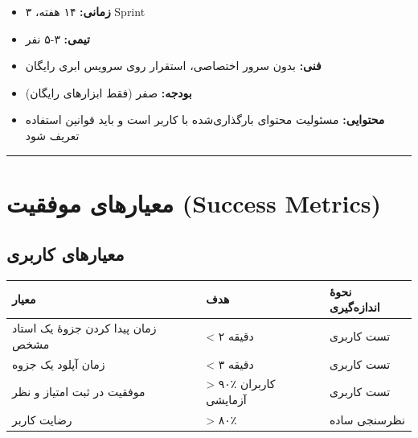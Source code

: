 \documentclass[12pt, a4paper]{article}
\begin{document}
\begin{itemize}
\tightlist
\item
  \textbf{زمانی:} ۱۴ هفته، ۳ Sprint
\item
  \textbf{تیمی:} ۳-۵ نفر
\item
  \textbf{فنی:} بدون سرور اختصاصی، استقرار روی سرویس ابری رایگان
\item
  \textbf{بودجه:} صفر (فقط ابزارهای رایگان)
\item
  \textbf{محتوایی:} مسئولیت محتوای بارگذاری‌شده با کاربر است و باید قوانین استفاده تعریف شود
\end{itemize}

\begin{center}\rule{0.5\linewidth}{0.5pt}\end{center}

\section{معیارهای موفقیت (Success Metrics)}

\subsection{معیارهای کاربری}

{\def\LTcaptype{none} %
\begin{longtable}[]{@{}
  >{\raggedright\arraybackslash}p{}
  >{\raggedright\arraybackslash}p{}
  >{\raggedright\arraybackslash}p{}@{}}
\toprule\noalign{}
\begin{minipage}[b]{\linewidth}\raggedright
معیار
\end{minipage} & \begin{minipage}[b]{\linewidth}\raggedright
هدف
\end{minipage} & \begin{minipage}[b]{\linewidth}\raggedright
نحوهٔ اندازه‌گیری
\end{minipage} \\
\midrule\noalign{}
\endhead
\bottomrule\noalign{}
\endlastfoot
زمان پیدا کردن جزوهٔ یک استاد مشخص & \textless{} ۲ دقیقه & تست کاربری \\
زمان آپلود یک جزوه & \textless{} ۳ دقیقه & تست کاربری \\
موفقیت در ثبت امتیاز و نظر & \textgreater{} ۹۰٪ کاربران آزمایشی & تست کاربری \\
رضایت کاربر & \textgreater{} ۸۰٪ & نظرسنجی ساده \\
\end{longtable}
}
\end{document}
